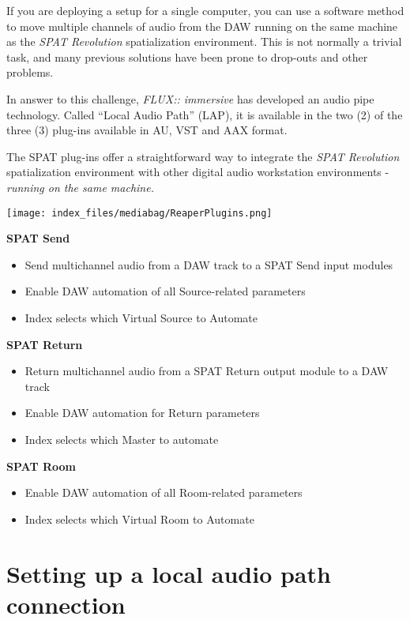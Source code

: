 \documentclass[
  letterpaper,
  DIV=11,
  numbers=noendperiod]{scrreport}
\begin{document}
If you are deploying a setup for a single computer, you can use a
software method to move multiple channels of audio from the DAW running
on the same machine as the \emph{SPAT Revolution} spatialization
environment. This is not normally a trivial task, and many previous
solutions have been prone to drop-outs and other problems.

In answer to this challenge, \emph{FLUX:: immersive} has developed an
audio pipe technology. Called ``Local Audio Path'' (LAP), it is
available in the two (2) of the three (3) plug-ins available in AU, VST
and AAX format.

The SPAT plug-ins offer a straightforward way to integrate the
\emph{SPAT Revolution} spatialization environment with other digital
audio workstation environments - \emph{running on the same machine.}

\texttt{[image: index\_files/mediabag/ReaperPlugins.png]}

\textbf{SPAT Send}

\begin{itemize}
\item
  Send multichannel audio from a DAW track to a SPAT Send input modules
\item
  Enable DAW automation of all Source-related parameters
\item
  Index selects which Virtual Source to Automate
\end{itemize}

\textbf{SPAT Return}

\begin{itemize}
\item
  Return multichannel audio from a SPAT Return output module to a DAW
  track
\item
  Enable DAW automation for Return parameters
\item
  Index selects which Master to automate
\end{itemize}

\textbf{SPAT Room}

\begin{itemize}
\item
  Enable DAW automation of all Room-related parameters
\item
  Index selects which Virtual Room to Automate
\end{itemize}

\hypertarget{setting-up-a-local-audio-path-connection}{%
\section{Setting up a local audio path
connection}\label{setting-up-a-local-audio-path-connection}}
\end{document}
